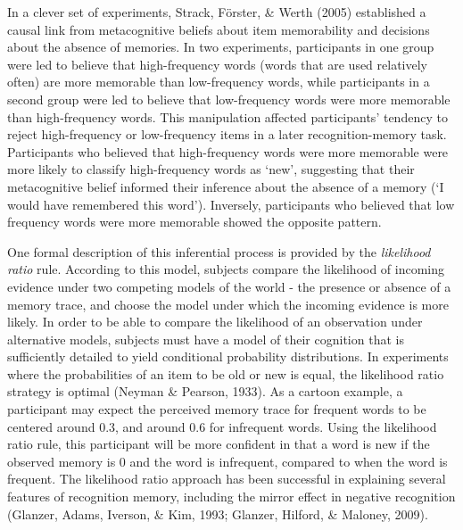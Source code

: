\documentclass[12pt,twoside]{reedthesis}
\begin{document}
In a clever set of experiments, Strack, Förster, \& Werth (2005) established a causal link from metacognitive beliefs about item memorability and decisions about the absence of memories. In two experiments, participants in one group were led to believe that high-frequency words (words that are used relatively often) are more memorable than low-frequency words, while participants in a second group were led to believe that low-frequency words were more memorable than high-frequency words. This manipulation affected participants' tendency to reject high-frequency or low-frequency items in a later recognition-memory task. Participants who believed that high-frequency words were more memorable were more likely to classify high-frequency words as `new', suggesting that their metacognitive belief informed their inference about the absence of a memory (`I would have remembered this word'). Inversely, participants who believed that low frequency words were more memorable showed the opposite pattern.

One formal description of this inferential process is provided by the \emph{likelihood ratio} rule. According to this model, subjects compare the likelihood of incoming evidence under two competing models of the world - the presence or absence of a memory trace, and choose the model under which the incoming evidence is more likely. In order to be able to compare the likelihood of an observation under alternative models, subjects must have a model of their cognition that is sufficiently detailed to yield conditional probability distributions. In experiments where the probabilities of an item to be old or new is equal, the likelihood ratio strategy is optimal (Neyman \& Pearson, 1933). As a cartoon example, a participant may expect the perceived memory trace for frequent words to be centered around 0.3, and around 0.6 for infrequent words. Using the likelihood ratio rule, this participant will be more confident in that a word is new if the observed memory is 0 and the word is infrequent, compared to when the word is frequent. The likelihood ratio approach has been successful in explaining several features of recognition memory, including the mirror effect in negative recognition (Glanzer, Adams, Iverson, \& Kim, 1993; Glanzer, Hilford, \& Maloney, 2009).
\end{document}
